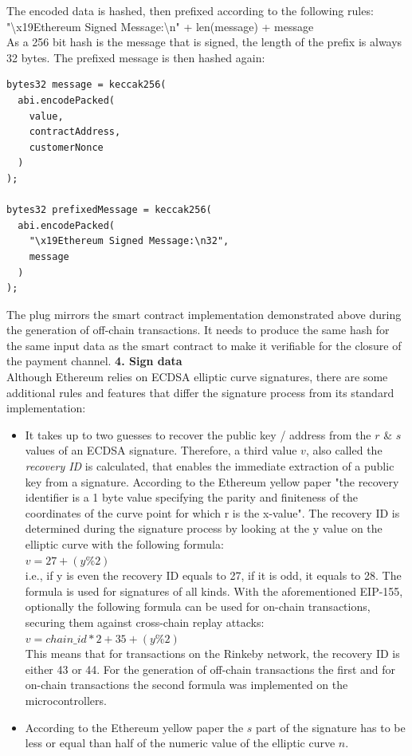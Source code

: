 The encoded data is hashed, then prefixed according to the following rules:
\\
"\textbackslash x19Ethereum Signed Message:\textbackslash n" + len(message) + message
\\
As a 256 bit hash is the message that is signed, the length of the prefix is always 32 bytes.
The prefixed message is then hashed again:
\\
\begin{lstlisting}[language=Solidity, numbers=none]
bytes32 message = keccak256(
  abi.encodePacked(
    value,
    contractAddress,
    customerNonce
  )
);

bytes32 prefixedMessage = keccak256(
  abi.encodePacked(
    "\x19Ethereum Signed Message:\n32",
    message
  )
);
\end{lstlisting}
The plug mirrors the smart contract implementation demonstrated above during the generation of off-chain transactions.
It needs to produce the same hash for the same input data as the smart contract to make it verifiable for the closure of the payment channel.
\newpage
\textbf{4. Sign data}\\
Although Ethereum relies on ECDSA elliptic curve signatures, there are some additional rules and features that differ the signature process from its standard implementation:
\begin{itemize}
  \item It takes up to two guesses to recover the public key / address from the $r$ \& $s$ values of an ECDSA signature.
  Therefore, a third value $v$, also called the \textit{recovery ID} is calculated, that enables the immediate extraction of a public key from a signature.
  According to the Ethereum yellow paper\cite{ethereum-yellow-paper} "the recovery identifier is a 1 byte value specifying the parity and finiteness of the coordinates of the curve point for which r is the x-value".
  The recovery ID is determined during the signature process by looking at the y value on the elliptic curve with the following formula:
  \\
  $v = 27 + (y \% 2)$
  \\
  i.e., if y is even the recovery ID equals to 27, if it is odd, it equals to 28.
  The formula is used for signatures of all kinds.
  With the aforementioned EIP-155, optionally the following formula can be used for on-chain transactions, securing them against cross-chain replay attacks:
  \\
  $v = chain\_id * 2 + 35 + (y \% 2)$
  \\
  This means that for transactions on the Rinkeby network, the recovery ID is either 43 or 44.
  For the generation of off-chain transactions the first and for on-chain transactions the second formula was implemented on the microcontrollers.
  \item According to the Ethereum yellow paper\cite{ethereum-yellow-paper} the $s$ part of the signature has to be less or equal than half of the numeric value of the elliptic curve $n$.
\end{itemize}
